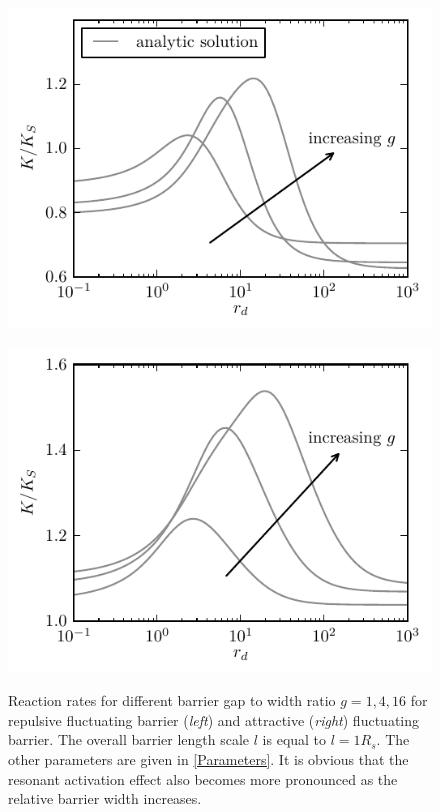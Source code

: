 \begin{minipage}[t]{.5 \textwidth}
    \begin{figure}[H]
        \includegraphics[width = 1 \textwidth]{plots/g2_rb_rates.pdf}
    \end{figure}
\end{minipage}\begin{minipage}[t]{.5 \textwidth}
    \begin{figure}[H]
        \includegraphics[width = 1 \textwidth]{plots/g2_ab_rates.pdf}
    \end{figure}
\end{minipage}

\begin{minipage}[t]{1 \textwidth}
    \begin{figure}[H]
        \caption{Reaction rates for different barrier gap to width ratio $g = 1, 4 ,16$ for repulsive fluctuating barrier (\emph{left}) and attractive (\emph{right}) fluctuating barrier. The overall barrier length scale $l$ is equal to $l=1 R_s$. The other parameters are given in \ref{Parameters}. It is obvious that the resonant activation effect also becomes more pronounced as the relative barrier width increases.\label{fig:var_g}}
    \end{figure}
\end{minipage} \vspace{0.5 cm} \\


